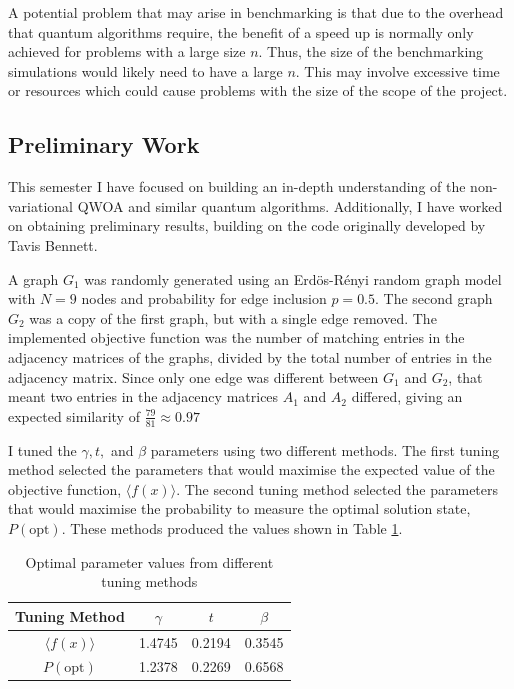 A potential problem that may arise in benchmarking is that due to the overhead that quantum algorithms require, the benefit of a speed up is normally only achieved for problems with a large size $n$. Thus, the size of the benchmarking simulations would likely need to have a large $n$. This may involve excessive time or resources which could cause problems with the size of the scope of the project.
\subsection{Preliminary Work}
This semester I have focused on building an in-depth understanding of the non-variational QWOA and similar quantum algorithms. Additionally, I have worked on obtaining preliminary results, building on the code originally developed by Tavis Bennett. 

A graph $G_{1}$ was randomly generated using an Erdös-Rényi random graph model \cite{erdos_renyi} with $N=9$ nodes and probability for edge inclusion  $p=0.5$. The second graph $G_{2}$ was a copy of the first graph, but with a single edge removed. The implemented objective function was the number of matching entries in the adjacency matrices of the graphs, divided by the total number of entries in the adjacency matrix. Since only one edge was different between $G_{1}$ and $G_{2}$, that meant two entries in the adjacency matrices $A_{1}$ and $A_{2}$ differed, giving an expected similarity of $\frac{79}{81}\approx 0.97$

I tuned the $\gamma, t,$ and $\beta$ parameters using two different methods. The first tuning method selected the parameters that would maximise the expected value of the objective function, $\langle f(x)\rangle$. The second tuning method selected the parameters that would maximise the probability to measure the optimal solution state, $P(\text{opt})$. These methods produced the values shown in Table \ref{table:1}.

\begin{table}[ht]
    \centering
    \begin{tabular}{|c|c|c|c|}
        \hline
        Tuning Method & $\gamma$ & $t$ & $\beta$\\
        \hline
        $\langle f(x)\rangle$ & 1.4745 & 0.2194 & 0.3545\\
        \hline
        $P(\text{opt})$ & 1.2378 & 0.2269 & 0.6568\\
        \hline
    \end{tabular}
    \caption{Optimal parameter values from different tuning methods }
    \label{table:1}
\end{table}

